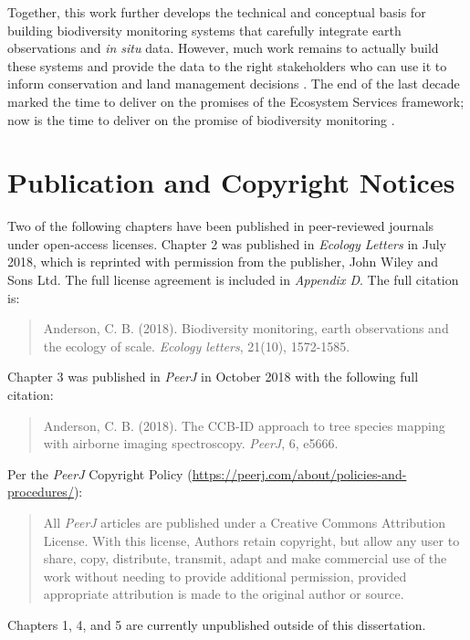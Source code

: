 Together, this work further develops the technical and conceptual basis for building biodiversity monitoring systems that carefully integrate earth observations and \textit{in situ} data. However, much work remains to actually build these systems and provide the data to the right stakeholders who can use it to inform conservation and land management decisions \cite{Guerry2015-zt, Ramirez-Reyes2019-nq}. The end of the last decade marked the time to deliver on the promises of the Ecosystem Services framework; now is the time to deliver on the promise of biodiversity monitoring \cite{Daily2009-jz, IPBES2019-hl}.

\clearpage

\section{Publication and Copyright Notices}

Two of the following chapters have been published in peer-reviewed journals under open-access licenses. Chapter 2 was published in \textit{Ecology Letters} in July 2018, which is reprinted with permission from the publisher, John Wiley and Sons Ltd. The full license agreement is included in \textit{Appendix D}. The full citation is:

\begin{quote}
    Anderson, C. B. (2018). Biodiversity monitoring, earth observations and the ecology of scale. \textit{Ecology letters}, 21(10), 1572-1585.
\end{quote}

\noindent Chapter 3 was published in \textit{PeerJ} in October 2018 with the following full citation:

\begin{quote}
    Anderson, C. B. (2018). The CCB-ID approach to tree species mapping with airborne imaging spectroscopy. \textit{PeerJ}, 6, e5666.
\end{quote}

\noindent Per the \textit{PeerJ} Copyright Policy (\url{https://peerj.com/about/policies-and-procedures/}):

\begin{quote}
    All \textit{PeerJ} articles are published under a Creative Commons Attribution License. With this license, Authors retain copyright, but allow any user to share, copy, distribute, transmit, adapt and make commercial use of the work without needing to provide additional permission, provided appropriate attribution is made to the original author or source.
\end{quote}

\noindent Chapters 1, 4, and 5 are currently unpublished outside of this dissertation.